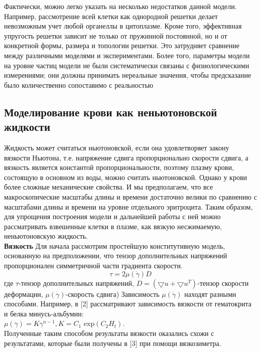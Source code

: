 \documentclass[a4paper, 14pt]{article}
\begin{document}
Фактически, можно легко указать на несколько недостатков данной модели. Например, рассмотрение всей клетки как однородной решетки делает невозможным учет любой органеллы в цитоплазме. Кроме того, эффективная упругость решетки зависит не только от пружинной постоянной, но и от конкретной формы, размера и топологии решетки. Это затрудняет сравнение между различными моделями и экспериментами. Более того, параметры модели на уровне частиц  модели не были систематически связаны с физиологическими измерениями; они должны принимать нереальные значения, чтобы предсказание было количественно сопоставимо с реальностью 


\subsection{Моделирование крови как неньютоновской жидкости}
Жидкость может считаться ньютоновской, если она удовлетворяет закону вязкости Ньютона, т.е. напряжение сдвига пропорционально скорости сдвига, а вязкость является константой пропорциональности, поэтому плазму крови, состоящую в основном из воды, можно считать ньютоновской. Однако у крови более сложные механические свойства. И мы предполагаем, что все макроскопические масштабы длины и времени достаточно велики по сравнению с масштабами длины и времени на уровне отдельного эритроцита. Таким образом, для упрощения построения модели и дальнейшей работы с ней можно рассматривать взвешенные клетки в плазме, как вязкую несжимаемую, неньютоновскую жидкость.\\

\textbf{Вязкость}
Для начала рассмотрим простейшую конститутивную модель, основанную на предположении, что тензор дополнительных напряжений пропорционален
симметричной части градиента скорости.\\
$$\tau=2\mu (\dot{\gamma})D$$
где $\tau $-тензор дополнительных напряжений, $D=(\bigtriangledown u+\bigtriangledown u^T)$-тензор скорости деформации, $\mu (\dot{\gamma})$-скорость сдвига)
Зависимость $\mu (\dot{\gamma})$ находят разными способами. Например, в [2]   рассматривают зависимость вязкости от гематокрита и белка минусь-альбумин: \\
$\mu (\dot{\gamma})=K{\gamma}^{n-1},  K=C_1$ exp$(C_2 H_t).$\\
Полученные таким способом результаты вязкости оказались схожи с результатами, которые были получены в [3] при помощи вязкозиметра.\\
\end{document}
